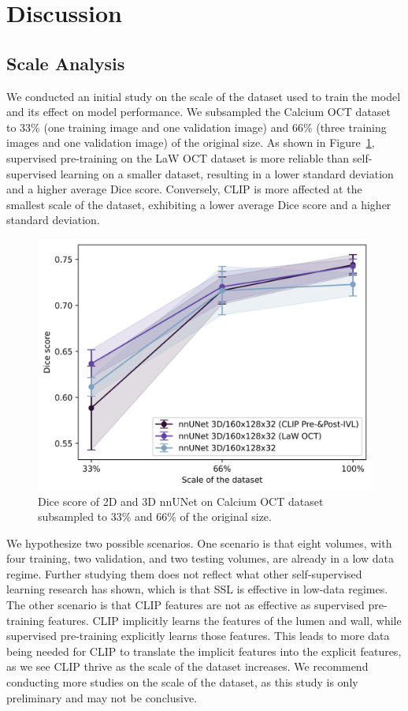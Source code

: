 \documentclass[a4paper,11pt,oneside]{report}
\begin{document}
\section{Discussion}
\subsection{Scale Analysis}
We conducted an initial study on the scale of the dataset used to train the model and its effect on model performance. We subsampled the Calcium OCT dataset to 33\% (one training image and one validation image) and 66\% (three training images and one validation image) of the original size. As shown in Figure~\ref{fig:scale-analysis}, supervised pre-training on the LaW OCT dataset is more reliable than self-supervised learning on a smaller dataset, resulting in a lower standard deviation and a higher average Dice score. Conversely, CLIP is more affected at the smallest scale of the dataset, exhibiting a lower average Dice score and a higher standard deviation. 

\begin{figure}[hbt]
    \centering
    \includegraphics[width=0.65\linewidth]{figures/discussion_scale_analysis.png}
    \caption{Dice score of 2D and 3D nnUNet on Calcium OCT dataset subsampled to 33\% and 66\% of the original size.}
    \label{fig:scale-analysis}
\end{figure}

We hypothesize two possible scenarios. One scenario is that eight volumes, with four training, two validation, and two testing volumes, are already in a low data regime.  Further studying them does not reflect what other self-supervised learning research has shown, which is that SSL is effective in low-data regimes. The other scenario is that CLIP features are not as effective as supervised pre-training features. CLIP implicitly learns the features of the lumen and wall, while supervised pre-training explicitly learns those features. This leads to more data being needed for CLIP to translate the implicit features into the explicit features, as we see CLIP thrive as the scale of the dataset increases. We recommend conducting more studies on the scale of the dataset, as this study is only preliminary and may not be conclusive.
\end{document}
